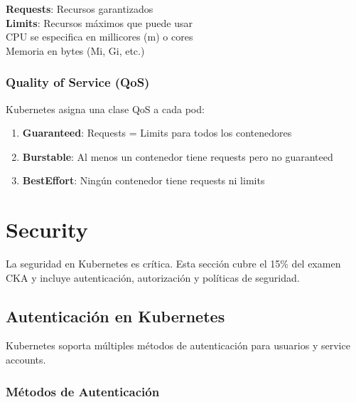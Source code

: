\documentclass[11pt,a4paper]{article}
\begin{document}
\begin{tipbox}
\textbf{Requests}: Recursos garantizados\\
\textbf{Limits}: Recursos máximos que puede usar\\
CPU se especifica en millicores (m) o cores\\
Memoria en bytes (Mi, Gi, etc.)
\end{tipbox}

\subsubsection{Quality of Service (QoS)}

Kubernetes asigna una clase QoS a cada pod:

\begin{enumerate}
    \item \textbf{\textcolor{k8ssuccess}{Guaranteed}}: Requests = Limits para todos los contenedores
    \item \textbf{\textcolor{k8swarning}{Burstable}}: Al menos un contenedor tiene requests pero no guaranteed
    \item \textbf{\textcolor{k8serror}{BestEffort}}: Ningún contenedor tiene requests ni limits
\end{enumerate}

\newpage


\section{Security}

\begin{errorbox}
La seguridad en Kubernetes es crítica. Esta sección cubre el 15\% del examen CKA y incluye autenticación, autorización y políticas de seguridad.
\end{errorbox}

\subsection{Autenticación en Kubernetes}

Kubernetes soporta múltiples métodos de autenticación para usuarios y service accounts.

\subsubsection{Métodos de Autenticación}
\end{document}
